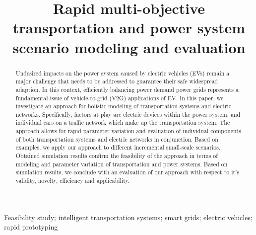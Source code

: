 \title{Rapid multi-objective transportation and power system scenario modeling and evaluation}

\author{
	\and
}

\maketitle

\begin{abstract}
Undesired impacts on the power system caused by electric vehicles (EVs) remain a major challenge that needs to be addressed to guarantee their safe widespread adaption. In this context, efficiently balancing power demand power grids represents a fundamental issue of vehicle-to-grid (V2G) applications of EV. In this paper, we investigate an approach for holistic modeling of transportation systems and electric networks. Specifically, factors at play are electric devices within the power system, and individual cars on a traffic network which make up the transportation system. The approach allows for rapid parameter variation and evaluation of individual components of both transportation systems and electric networks in conjunction. Based on examples, we apply our approach to different incremental small-scale scenarios. Obtained simulation results confirm the feasibility of the approach in terms of modeling and parameter variation of transportation and power systems. Based on simulation results, we conclude with an evaluation of our approach with respect to it's validity, novelty, efficiency and applicability.
\end{abstract}

\begin{keywords}
Feasibility study; intelligent transportation systems; smart grids; electric vehicles;  rapid prototyping
\end{keywords}